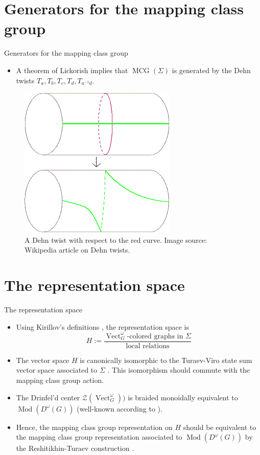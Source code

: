 \documentclass{beamer}
\DeclareMathOperator{\MCG}{MCG}
\DeclareMathOperator{\Vect}{Vect}
\DeclareMathOperator{\Mod}{Mod}
\begin{document}
\section{Generators for the mapping class group}

\begin{frame}{Generators for the mapping class group}
  \begin{itemize}
        \item A theorem  of Lickorish \cite{lickorish1964finite}  implies that $\MCG(\Sigma)$ is generated by the Dehn twists $T_a, T_b, T_c, T_d, T_{a^{-1}d}$.  
  \end{itemize}
  
  \begin{figure}[h]
    \centering
    \includegraphics[height=0.4\textheight,keepaspectratio]{Dehn_twist.png}
    \caption{A Dehn twist with respect to the red curve. Image source: Wikipedia article on Dehn twists.}
    \end{figure}    
\end{frame}



\section{The representation space}

\begin{frame}{The representation space}
  \begin{itemize}
    \item 
        Using Kirillov's definitions \cite{kirillovStringNets}, the representation space is
        $$H := \frac{\text{$\Vect^\omega_G$-colored graphs in $\Sigma$}  }
    {\text{local relations}}$$
    \pause
    \item The vector space $H$ is canonically isomorphic to the Turaev-Viro state sum vector space 
    associated to $\Sigma$ \cite{kirillovStringNets}.  This isomorphism should commute with the mapping class group
    action.
    \pause \item  The Drinfel'd center $\mathcal Z (\Vect^\omega_G))$ is braided monoidally equivalent to
    $\Mod(D^\omega(G))$ (well-known according to \cite{0704.0195}).
    \pause \item Hence, the mapping class group representation on $H$ should be equivalent to the mapping class group representation 
    associated to $\Mod(D^\omega(G))$ by the Reshitikhin-Turaev construction \cite[preprint]{1012.0560}.
   \end{itemize}
\end{frame}
\end{document}
